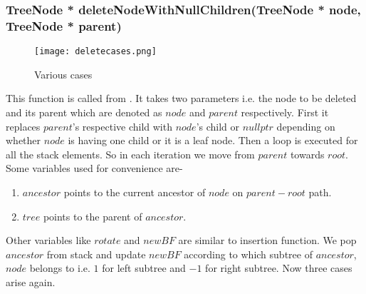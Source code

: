 \documentclass{article}
\begin{document}
\subsubsection{TreeNode * deleteNodeWithNullChildren(TreeNode * node, TreeNode * parent)}
\label{del}
\begin{figure}
\texttt{[image: deletecases.png]}
\caption{Various cases}
\label{fig:delete}
\end{figure}
This function is called from . It takes two parameters i.e. the node to be deleted and its parent which are denoted as $node$ and $parent$ respectively. First it replaces $parent$'s respective child with $node$'s child or $nullptr$ depending on whether $node$ is having one child or it is a leaf node. Then a loop is executed for all the stack elements. So in each iteration we move from $parent$ towards $root$.\newline
Some variables used for convenience are-
\begin{enumerate}
	\item \textbf{$ancestor$} points to the current ancestor of $node$ on $parent-root$ path.
	\item \textbf{$tree$} points to the parent of $ancestor$.
\end{enumerate}
Other variables like $rotate$ and $newBF$ are similar to insertion function.\newline
We pop $ancestor$ from stack and update $newBF$ according to which subtree of $ancestor$, $node$ belongs to i.e. $1$ for left subtree and $-1$ for right subtree.\newline
Now three cases arise again.
\end{document}

